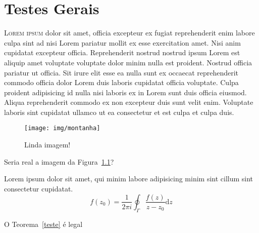 \documentclass[12pt]{../libellum}
\begin{document}
 
% 
%
  \sumario
%
%
  \blinddocument
%
  \blindtext {}
% 
%
  \chapter{Testes Gerais}
   \lettrine[lines=3]{\initial\color{azulUFRB} L}{orem ipsum} dolor sit 
   amet, officia excepteur ex fugiat reprehenderit enim labore culpa sint 
   ad nisi Lorem pariatur mollit ex esse exercitation amet. 
   Nisi anim cupidatat excepteur officia. 
   Reprehenderit nostrud nostrud ipsum Lorem est aliquip amet voluptate 
   voluptate dolor minim nulla est proident. 
   Nostrud officia pariatur ut officia. 
   Sit irure elit esse ea nulla sunt ex occaecat reprehenderit commodo 
   officia dolor Lorem duis laboris cupidatat officia voluptate. 
   Culpa proident adipisicing id nulla nisi laboris ex in Lorem sunt duis 
   officia eiusmod. 
   Aliqua reprehenderit commodo ex non excepteur duis sunt velit enim. 
   Voluptate laboris sint cupidatat ullamco ut ea consectetur et est culpa 
   et culpa duis.

\begin{figure}[!htbp]
  \centering
  \texttt{[image: img/montanha]}
  \caption{Linda imagem!}
  \label{fig:montanha}
\end{figure}

Seria real a imagem da Figura~\ref{fig:montanha}?


\begin{teorema}[(de Cauchy)]\label{teste}
  Lorem ipsum dolor sit amet, qui minim labore adipisicing minim sint 
  cillum sint consectetur cupidatat.
  \[
    f(z_0) = 
    \frac{1}{2 \pi i} \oint_{\Gamma} \frac{f(z)}{z - z_0} \mathrm{d} z
  \]
\end{teorema}

O Teorema~\ref{teste} é legal
\end{document}
